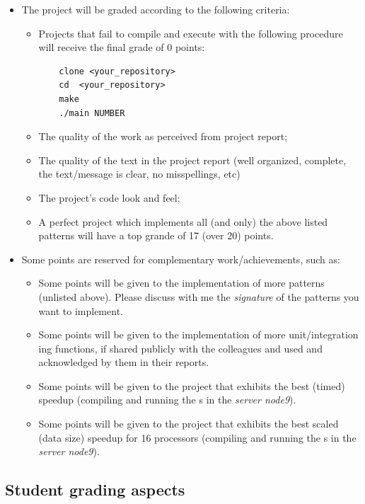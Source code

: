 \documentclass[11pt]{article}
\begin{document}
\begin{itemize}
  \item The project will be graded according to the following criteria:
  \begin{itemize}
    \item Projects that fail to compile and execute with the following procedure will receive the final grade of 0 points:
\begin{verbatim}
    clone <your_repository>
    cd  <your_repository>
    make
    ./main NUMBER
\end{verbatim}
    \item The quality of the work as perceived from project report;
    \item The quality of the text in the project report (well organized, complete, the text/message is clear, no misspellings, etc)
    \item The project's code look and feel;
    \item A perfect project which implements all (and only) the above listed patterns will have a top grande of 17 (over 20) points.
  \end{itemize}
  \item Some points are reserved for complementary work/achievements, such as:
  \begin{itemize}
    \item Some points will be given to the implementation of more patterns (unlisted above).  Please discuss with me the \emph{signature} of the patterns you want to implement.
    \item Some points will be given to the implementation of more unit/integration ing functions, if shared publicly with the colleagues and used and acknowledged by them in their reports.
    \item Some points will be given to the project that exhibits the best (timed) speedup (compiling and running the s in the \emph{server node9}).
    \item Some points will be given to the project that exhibits the best scaled (data size) speedup for 16 processors (compiling and running the s in the \emph{server node9}).
  \end{itemize}
    
\end{itemize}

\subsection{Student grading aspects}
\end{document}
